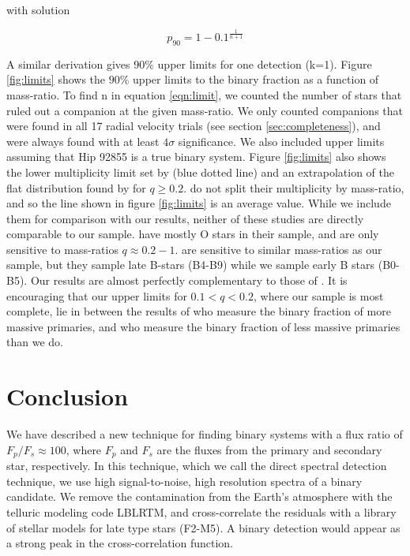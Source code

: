 \documentclass[11pt]{report}     %
\begin{document}
with solution

\begin{equation}
p_{90} = 1 - 0.1^{\frac{1}{n+1}}
\label{eqn:limit}
\end{equation}

A similar derivation gives $90\%$ upper limits for one detection (k=1).
Figure \ref{fig:limits} shows the $90\%$ upper limits to the binary
fraction as a function of mass-ratio. To find n in equation
\ref{eqn:limit}, we counted the number of stars that ruled out a
companion at the given mass-ratio. We only counted companions that
were found in all 17 radial velocity trials (see section
\ref{sec:completeness}), and were always found with at least $4\sigma$
significance. We also included upper limits assuming that Hip 92855 is
a true binary system. Figure \ref{fig:limits} also shows the lower
multiplicity limit set by \cite{Evans2010} (blue dotted line) and an
extrapolation of the flat distribution found by
\cite{Sana2011} for $q \geq 0.2$. \cite{Evans2010} do not split their multiplicity by mass-ratio,
and so the line shown in figure \ref{fig:limits} is an average value. While
we include them for comparison with our results, neither of these studies are
directly comparable to our sample. \cite{Sana2011} have mostly O stars in
their sample, and are only sensitive to mass-ratios $q\approx
0.2-1$. \cite{Evans2010} are sensitive to similar mass-ratios as our
sample, but they sample late B-stars (B4-B9) while we sample early B
stars (B0-B5). Our results are almost perfectly complementary to those of \cite{Evans2010}. It
is encouraging that our upper limits for $0.1<q<0.2$, where our sample
is most complete, lie in between the results of
\cite{Sana2011} who measure the binary fraction of more massive
primaries, and \cite{Evans2010} who measure the binary fraction of
less massive primaries than we do.



\section{Conclusion}
\label{sec:conclusions}
We have described a new technique for finding binary systems with a
flux ratio of $F_p/F_s \approx 100$, where $F_p$ and $F_s$ are
the fluxes from the primary and secondary star, respectively. In this
technique, which we call the direct spectral detection technique, we
use high signal-to-noise, high resolution spectra of a binary candidate.
We remove the contamination from the Earth's atmosphere with the telluric 
modeling code LBLRTM, and cross-correlate the residuals with a library of stellar 
models for late type stars (F2-M5). A binary detection would appear as a strong 
peak in the cross-correlation function.
\end{document}
